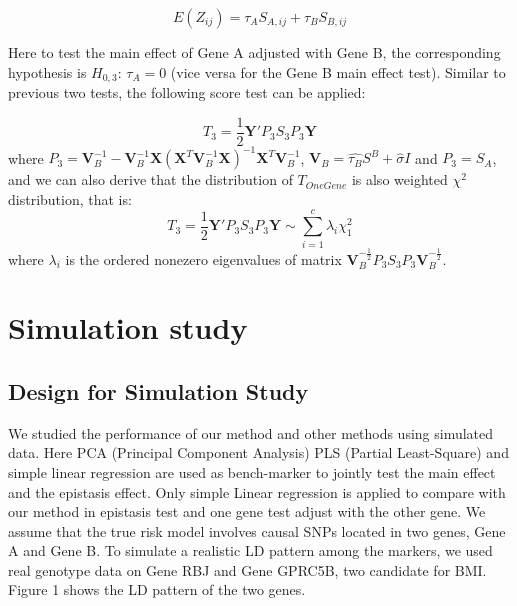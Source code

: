 \documentclass{article}
\newcommand{\Y}{\mathbf{Y}}
\newcommand{\X}{\mathbf{X}}
\newcommand{\V}{\mathbf{V}}
\newcommand{\VV}{\mathbf{V}^{-1}}
\begin{document}
        \[
            E(Z_{ij})=\tau_AS_{A,ij}+\tau_BS_{B,ij}
        \]

        Here to test the main effect of Gene A adjusted with Gene B, the corresponding hypothesis is $H_{0,3}$: $\tau_A=0$ (vice versa for the Gene B main effect test). Similar to previous two tests, the following score test can be applied:

        \[
            T_3=\frac{1}{2}\Y'P_3S_3P_3\Y
        \]
        where $P_3=\VV_B-\VV_B\X(\X^T\VV_B\X)^{-1}\X^T\VV_B$, $\V_B=\hat{\tau_B}S^B+\hat{\sigma}I$ and $P_3=S_A$, and we can also derive that the distribution of $T_{OneGene}$ is also weighted $\chi^2$ distribution, that is:
        \[
            T_3=\frac{1}{2}\Y'P_3S_3P_3\Y\sim\sum_{i=1}^c\lambda_i\chi^2_1
        \]
        where $\lambda_i$ is the  ordered nonezero eigenvalues of matrix $\V_B^{-\frac{1}{2}}P_3S_3P_3\V_B^{-\frac{1}{2}}$.

    \section{Simulation study}
        \subsection{Design for Simulation Study}

        We studied the performance of our method and other methods using simulated data. 
        Here PCA (Principal Component Analysis) PLS (Partial Least-Square) and simple linear regression are used as bench-marker to jointly test the main effect and the epistasis effect. Only simple Linear regression is applied to compare with our method in epistasis test and one gene test adjust with the other gene.
        We assume that the true risk model involves causal SNPs located in two genes, Gene A and Gene B. To simulate a realistic LD pattern among the markers, we used real genotype data on Gene RBJ and Gene GPRC5B, two candidate for BMI. Figure 1 shows the LD pattern of the two genes.
\end{document}

